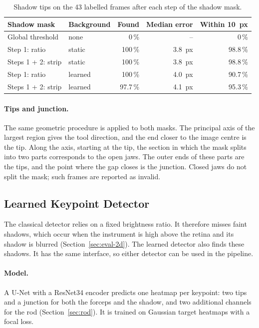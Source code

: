 \documentclass[english]{tum-article}
\begin{document}
\begin{table}[t]
  \centering
  \caption{Shadow tips on the 43 labelled frames after each step of the shadow
    mask.}
  \label{tab:vessels}
  \begin{tabular}{llrrr}
    \toprule
    Shadow mask & Background & Found & Median error & Within \SI{10}{px} \\
    \midrule
    Global threshold           & none    & 0\,\%     & --              & 0\,\%    \\
    Step 1: ratio              & static  & 100\,\%   & \SI{3.8}{px}    & 98.8\,\% \\
    Steps 1 + 2: strip         & static  & 100\,\%   & \SI{3.8}{px}    & 98.8\,\% \\
    Step 1: ratio              & learned & 100\,\%   & \SI{4.0}{px}    & 90.7\,\% \\
    Steps 1 + 2: strip         & learned & 97.7\,\%  & \SI{4.1}{px}    & 95.3\,\% \\
    \bottomrule
  \end{tabular}
\end{table}

\paragraph{Tips and junction.} The same geometric procedure is applied to both
masks. The principal axis of the largest region gives the tool direction, and
the end closer to the image centre is the tip. Along the axis, starting at the
tip, the section in which the mask splits into two parts corresponds to the
open jaws. The outer ends of these parts are the tips, and the point where the
gap closes is the junction. Closed jaws do not split the mask; such frames are
reported as invalid.

\subsection{Learned Keypoint Detector}
\label{sec:detection-learned}

The classical detector relies on a fixed brightness ratio. It therefore misses
faint shadows, which occur when the instrument is high above the retina and its
shadow is blurred (Section~\ref{sec:eval-2d}). The learned detector also finds
these shadows. It has the same interface, so either detector can be used in the
pipeline.

\paragraph{Model.} A U-Net with a ResNet34 encoder predicts one heatmap per
keypoint: two tips and a junction for both the forceps and the shadow, and two
additional channels for the rod (Section~\ref{sec:rod}). It is trained on
Gaussian target heatmaps with a focal loss.
\end{document}
